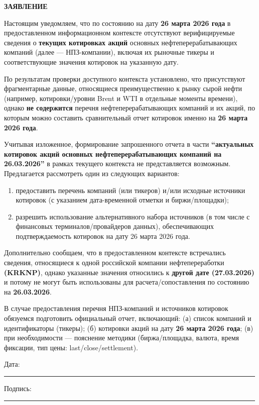 \documentclass[12pt]{article}
\begin{document}
\begin{center}
\textbf{\LARGE ЗАЯВЛЕНИЕ}
\end{center}

\vspace{1cm}




Настоящим уведомляем, что по состоянию на дату \textbf{26 марта 2026 года} в предоставленном информационном контексте отсутствуют верифицируемые сведения о \textbf{текущих котировках акций} основных нефтеперерабатывающих компаний (далее — НПЗ-компании), включая их рыночные тикеры и соответствующие значения котировок на указанную дату.

По результатам проверки доступного контекста установлено, что присутствуют фрагментарные данные, относящиеся преимущественно к рынку сырой нефти (например, котировки/уровни Brent и WTI в отдельные моменты времени), однако \textbf{не содержится} перечня нефтеперерабатывающих компаний и их акций, по которым можно составить сравнительный отчет котировок именно на \textbf{26 марта 2026 года}.

Учитывая изложенное, формирование запрошенного отчета в части \textbf{“актуальных котировок акций основных нефтеперерабатывающих компаний на 26.03.2026”} в рамках текущего контекста не представляется возможным. Предлагается рассмотреть один из следующих вариантов:

\begin{enumerate}
\item предоставить перечень компаний (или тикеров) и/или исходные источники котировок (с указанием дата-временной отметки и биржи/площадки);
\item разрешить использование альтернативного набора источников (в том числе с финансовых терминалов/провайдеров данных), обеспечивающих подтверждаемость котировок на дату 26 марта 2026 года.
\end{enumerate}

Дополнительно сообщаем, что в предоставленном контексте встречались сведения, относящиеся к одной российской компании нефтепереработки \textbf{(KRKNP)}, однако указанные значения относились к \textbf{другой дате (27.03.2026)} и потому не могут быть использованы для расчета/сопоставления по состоянию на \textbf{26.03.2026}.

В случае предоставления перечня НПЗ-компаний и источников котировок обязуемся подготовить официальный отчет, включающий:
(а) список компаний и идентификаторы (тикеры);
(б) котировки акций на дату \textbf{26 марта 2026 года};
(в) при необходимости — пояснение методики (биржа/площадка, валюта, время фиксации, тип цены: last/close/settlement).

\vfill

\noindent
Дата: \rule{5cm}{0.4pt} \hfill Подпись: \rule{5cm}{0.4pt}
\end{document}
